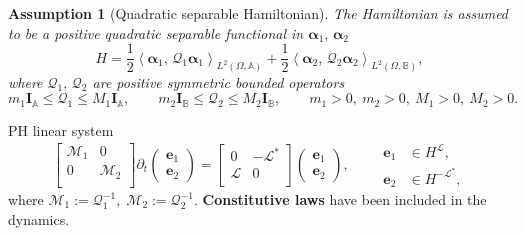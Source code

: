 \documentclass[aspectratio=169]{ISAE-Beamer}
\newcommand{\inner}[3][]{\ensuremath{\left\langle #2, \, #3 \right\rangle_{#1}}}
\newtheorem{assumption}{Assumption}
\begin{document}
\begin{frame}
	\begin{assumption}[Quadratic separable Hamiltonian]
		The Hamiltonian is assumed to be a positive quadratic separable functional in $\bm{\alpha}_1, \, \bm{\alpha}_2$ 
		\begin{equation*}
			H = \frac{1}{2} \inner[L^2(\Omega, \mathbb{A})]{\bm{\alpha}_{1}}{\mathcal{Q}_1\bm{\alpha}_{1}} + \frac{1}{2} \inner[L^2(\Omega, \mathbb{B})]{\bm{\alpha}_{2}}{\mathcal{Q}_2\bm{\alpha}_{2}},
		\end{equation*}
		where $\mathcal{Q}_1, \, \mathcal{Q}_2$ are positive symmetric bounded operators
		\begin{equation*}
			m_1 \bm{I}_\mathbb{A} \le\mathcal{Q}_1 \le M_1 \bm{I}_\mathbb{A}, \qquad  m_2 \bm{I}_\mathbb{B} \le \mathcal{Q}_2 \le M_2 \bm{I}_\mathbb{B}, \qquad m_1>0, \ m_2>0, \ M_1>0, \ M_2>0.
		\end{equation*} 
	\end{assumption}
	
	
	\begin{exampleblock}{PH linear system}
		\begin{equation*}
			\begin{bmatrix}
				\mathcal{M}_1 & 0 \\
				0 & \mathcal{M}_2 \\
			\end{bmatrix}
			\partial_t \begin{pmatrix}
				\bm{e}_1 \\ \bm{e}_2
			\end{pmatrix} = \begin{bmatrix}
				0 &  - \mathcal{L}^* \\
				\mathcal{L} & 0 \\
			\end{bmatrix}\begin{pmatrix}
				\bm{e}_1 \\ \bm{e}_2
			\end{pmatrix} , \qquad \begin{aligned}
				\bm{e}_1 &\in H^{\mathcal{L}}, 	\\
				\bm{e}_2 &\in H^{-\mathcal{L}^*},
			\end{aligned}
		\end{equation*}
		where $\mathcal{M}_1:=\mathcal{Q}_1^{-1},\; \mathcal{M}_2:=\mathcal{Q}_2^{-1}$. \textbf{Constitutive laws} have been included in the dynamics.
	\end{exampleblock}
	
\end{frame}
\end{document}
